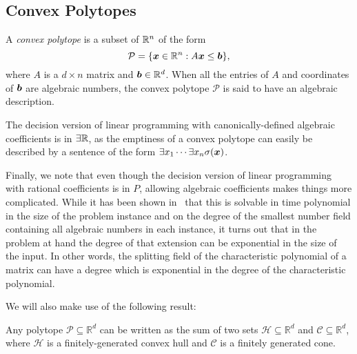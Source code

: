 \subsection{Convex Polytopes}

A \emph{convex polytope} is a subset of $\mathbb{R}^{n}$ of the form
\begin{equation*}
\mathcal{P} = \lbrace \boldsymbol{x} \in \mathbb{R}^{n} : A \boldsymbol{x} \leq \boldsymbol{b} \rbrace ,
\end{equation*}
where $A$ is a $d \times n$ matrix and $\boldsymbol{b} \in \mathbb{R}^{d}$. When all the entries of $A$ and coordinates of $\boldsymbol{b}$ are algebraic numbers, the convex polytope $\mathcal{P}$ is said to have an algebraic description.

The decision version of linear programming with canonically-defined algebraic coefficients is in $\exists\mathbb{R}$, as the emptiness of a convex polytope can easily be described by a sentence of the form $\exists x_1 \cdots \exists x_n \sigma(\boldsymbol{x})$.

Finally, we note that even though the decision version of linear
programming with rational coefficients is in $\mathit{P}$, allowing
algebraic coefficients makes things more complicated. While it has
been shown in~\cite{AdlerB94} that this is solvable in time polynomial
in the size of the problem instance and on the degree of the smallest
number field containing all algebraic numbers in each instance, it
turns out that in the problem at hand the degree of that extension can
be exponential in the size of the input. In other words, the splitting
field of the characteristic polynomial of a matrix can have a degree
which is exponential in the degree of the characteristic polynomial.

We will also make use of the following result:
\begin{theorem}
  Any polytope $\mathcal{P} \subseteq \mathbb{R}^{d}$ can be written as the sum of two sets $\mathcal{H} \subseteq \mathbb{R}^{d}$ and $\mathcal{C} \subseteq \mathbb{R}^{d}$, where $\mathcal{H}$ is a finitely-generated convex hull and $\mathcal{C}$ is a finitely generated cone.
\end{theorem}

